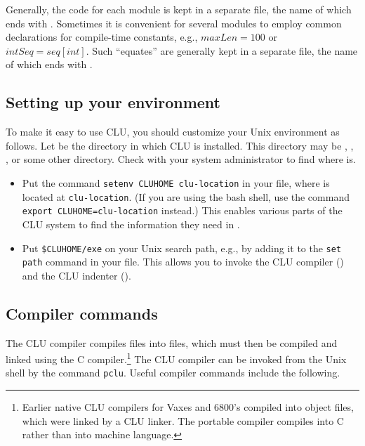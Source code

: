      Generally, the code for each module is kept in a separate file, the name
of which ends with .  Sometimes it is convenient for several
modules to employ common declarations for compile-time constants, e.g., $maxLen
= 100$ or $intSeq = seq[int]$.  Such ``equates'' are generally kept in a
separate file, the name of which ends with .

\subsection{Setting up your environment}

To make it easy to use CLU, you should customize your Unix environment as
follows.  Let \cludir{} be the directory in which CLU is installed.  This
directory may be , , , or
some other directory.  Check with your system administrator to find where
\cludir{} is.

\begin{itemize}
\item
Put the command {\tt setenv CLUHOME clu-location} in your  file,
where \cludir{} is located at {\tt clu-location}.  (If you are using the bash
shell, use the command {\tt export CLUHOME=clu-location} instead.)  This enables
various parts of the CLU system to find the information they need in \cludir{}.
\item
Put {\tt \$CLUHOME/exe} on your Unix search path, e.g., by adding it to the
{\tt set path} command in your  file.  This allows you to invoke
the CLU compiler () and the CLU indenter ().
\end{itemize}

\subsection{Compiler commands}

The CLU compiler compiles  files into  files, which must
then be compiled and linked using the C compiler.\footnote{Earlier native CLU
compilers for Vaxes and 6800's compiled  into object 
files, which were linked by a CLU linker.  The portable compiler compiles into
C rather than into machine language.} The CLU compiler can be invoked from the
Unix shell by the command {\tt pclu}.  Useful compiler commands include the
following.

